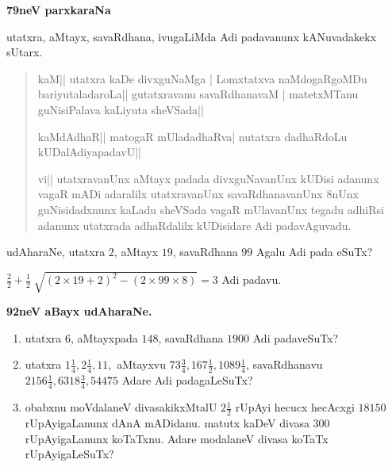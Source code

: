 \vskip 1cm

\begin{center}
{\bf\LARGE 79neV parxkaraNa}
\end{center}

utatxra, aMtayx, savaRdhana, ivugaLiMda Adi padavanunx kANuvadakekx sUtarx.

\begin{verse}
kaM|| utatxra kaDe divxguNaMga | Lomxtatxva naMdogaRgoMDu bariyutaladaroLa|| gutatxravanu savaR\-dhanavaM | matetxMTanu guNisiPalava kaLiyuta sheVSada||

kaMdAdhaR|| matogaR mUladadhaRva| nutatxra dadhaRdoLu kUDalAdiyapadavU||

vi|| utatxravanUnx aMtayx padada divxguNavanUnx kUDisi adanunx vagaR  mADi adaralilx utatxravanUnx savaRdhanavanUnx $8$nUnx guNisidadxnunx kaLadu sheVSada vagaR mUlavanUnx tegadu adhiRsi adanunx utatxrada adhaRdalilx kUDisidare Adi padavAguvadu.
\end{verse}

udAharaNe, utatxra $2$, aMtayx $19$, savaRdhana $99$ Agalu Adi pada eSuTx?

\qq$\tfrac{2}{2}+\tfrac{1}{2}\; \sqrt{(2\times19+2)^{2}-(2\times99\times8)}=3$ Adi padavu.

\begin{center}
{\bf\large 92neV aBayx udAharaNe.}
\end{center}

\begin{enumerate}[\rm(1)]
\item utatxra $6$, aMtayxpada $148$, savaRdhana $1900$ Adi padaveSuTx?

\item utatxra $1\tfrac{1}{4}, 2\tfrac{1}{4}, 11,$ aMtayxvu $73\tfrac{3}{4}, 167\tfrac{1}{2}, 1089\tfrac{1}{4}$, savaRdhanavu $2156\tfrac{1}{4}, 6318\tfrac{3}{4}, 54475$ Adare Adi padagaLeSuTx?

\item obabxnu moVdalaneV divasakikxMtalU $2\tfrac{1}{2}$ rUpAyi hecucx hecAcxgi $18150$ rUpAyigaLanunx dAnA mADidanu. matutx kaDeV divasa $300$ rUpAyigaLanunx koTaTxnu. Adare modalaneV divasa koTaTx rUpAyigaLeSuTx?
 
\end{enumerate}
